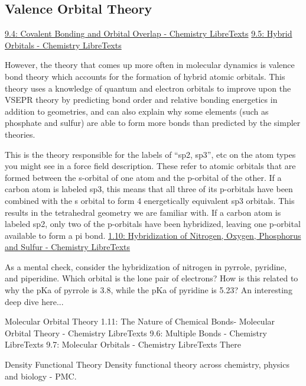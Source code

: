 \subsection{Valence Orbital Theory}
\href{https://chem.libretexts.org/Bookshelves/General_Chemistry/Map%3A_Chemistry_-_The_Central_Science_(Brown_et_al.)/09%3A_Molecular_Geometry_and_Bonding_Theories/9.04%3A_Covalent_Bonding_and_Orbital_Overlap}{9.4: Covalent Bonding and Orbital Overlap - Chemistry LibreTexts}
\href{https://chem.libretexts.org/Bookshelves/General_Chemistry/Map%3A_Chemistry_-_The_Central_Science_(Brown_et_al.)/09%3A_Molecular_Geometry_and_Bonding_Theories/9.05%3A_Hybrid_Orbitals}{9.5: Hybrid Orbitals - Chemistry LibreTexts}

However, the theory that comes up more often in molecular dynamics is valence bond theory which accounts for the formation of hybrid atomic orbitals. This theory uses a knowledge of quantum and electron orbitals to improve upon the VSEPR theory by predicting bond order and relative bonding energetics in addition to geometries, and can also explain why some elements (such as phosphate and sulfur) are able to form more bonds than predicted by the simpler theories.

This is the theory responsible for the labels of “sp2, sp3”, etc on the atom types you might see in a force field description. These refer to atomic orbitals that are formed between the s-orbital of one atom and the p-orbital of the other. If a carbon atom is labeled sp3, this means that all three of its p-orbitals have been combined with the s orbital to form 4 energetically equivalent sp3 orbitals. This results in the tetrahedral geometry we are familiar with. If a carbon atom is labeled sp2, only two of the p-orbitals have been hybridized, leaving one p-orbital available to form a pi bond. 
\href{1.10: Hybridization of Nitrogen, Oxygen, Phosphorus and Sulfur - Chemistry LibreTexts}{1.10: Hybridization of Nitrogen, Oxygen, Phosphorus and Sulfur - Chemistry LibreTexts}

As a mental check, consider the hybridization of nitrogen in pyrrole, pyridine, and piperidine. Which orbital is the lone pair of electrons? How is this related to why the pKa of pyrrole is 3.8, while the pKa of pyridine is 5.23? 
An interesting deep dive here...

Molecular Orbital Theory
1.11: The Nature of Chemical Bonds- Molecular Orbital Theory - Chemistry LibreTexts
9.6: Multiple Bonds - Chemistry LibreTexts
9.7: Molecular Orbitals - Chemistry LibreTexts
There


Density Functional Theory
Density functional theory across chemistry, physics and biology - PMC.
